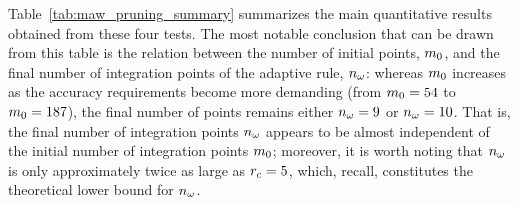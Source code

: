 \documentclass[11pt,a4paper]{article}
\begin{document}


Table~\ref{tab:maw_pruning_summary} summarizes the main quantitative results obtained from these four tests. The most notable conclusion that can be drawn from this table is the relation between the number of initial points, $m_0$, and the final number of integration points of the adaptive rule, $n_{\omega}$: whereas $m_0$ increases as the accuracy requirements become more demanding (from $m_0=54$ to $m_0 = 187$), the final number of points remains either $n_{\omega} = 9$ or $n_{\omega} = 10$.  That is, the final number of integration points $n_{\omega}$ appears to be almost independent of the initial number of integration points $m_0$; moreover, it is worth noting that $n_{\omega}$ is only approximately twice as large as $r_c = 5$, which, recall, constitutes the theoretical lower bound for  $n_{\omega}$.

%
\end{document}
